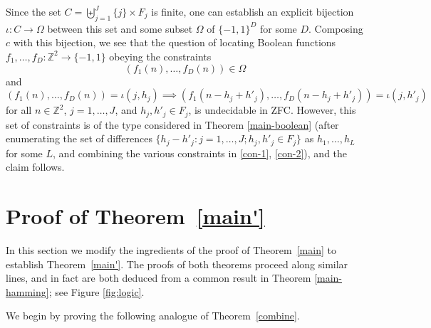 \documentclass[reqno,a4paper,12pt]{amsart}
\numberwithin{equation}{section}
\numberwithin{figure}{section}
\def\Z{\mathbb{Z}}
\theoremstyle{plain}
\theoremstyle{definition}
\newcommand{\thmref}[1]{Theorem~\ref{#1}}
\begin{document}
Since the set $C=\biguplus_{j=1}^J \{j\} \times F_j$ is finite, one can establish an explicit bijection $\iota \colon C \to \Omega$ between this set and some subset $\Omega$ of $\{-1,1\}^D$ for some $D$.  Composing $c$ with this bijection, we see that the question of locating Boolean functions $f_1,\dots,f_D \colon \Z^2 \to \{-1,1\}$ obeying the constraints
\begin{equation}\label{con-1}
(f_1(n),\dots,f_D(n)) \in \Omega
\end{equation}
and
\begin{equation}\label{con-2}
(f_1(n),\dots,f_D(n)) = \iota(j,h_j) \implies (f_1(n-h_j+h'_j),\dots,f_D(n-h_j+h'_j)) = \iota(j,h'_j)
\end{equation}
for all $n \in \Z^2$, $j=1,\dots,J$, and $h_j, h'_j \in F_j$, is undecidable in ZFC.  However, this set of constraints is of the type considered in Theorem \ref{main-boolean} (after enumerating the set of differences $\{ h_j - h'_j: j=1,\dots,J; h_j,h'_j \in F_j\}$ as $h_1,\dots,h_L$ for some $L$, and combining the various constraints in \eqref{con-1}, \eqref{con-2}), and the claim follows.

\section{Proof of \thmref{main'} }\label{extension}

In this section we modify the ingredients of the proof of \thmref{main} to establish \thmref{main'}. The proofs of both theorems proceed along similar lines, and in fact are both deduced from a common result in Theorem \ref{main-hamming}; see Figure \ref{fig:logic}.

We begin by proving the following analogue of \thmref{combine}. 
\end{document}
